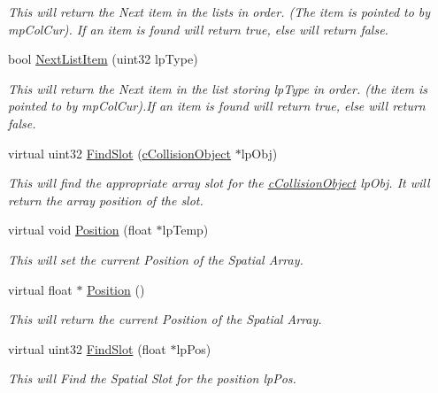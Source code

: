 \begin{DoxyCompactItemize}
\begin{DoxyCompactList}\small\item\em This will return the Next item in the lists in order. (The item is pointed to by mpColCur). If an item is found will return true, else will return false. \item\end{DoxyCompactList}\item 
bool \hyperlink{classc_collision_handler_type_adcf86464b4fd085e86f2c3365f7d3452}{NextListItem} (uint32 lpType)
\begin{DoxyCompactList}\small\item\em This will return the Next item in the list storing lpType in order. (the item is pointed to by mpColCur).If an item is found will return true, else will return false. \item\end{DoxyCompactList}\item 
virtual uint32 \hyperlink{classc_collision_handler_type_a6935d209eccb9c605fac6208c61b98b7}{FindSlot} (\hyperlink{classc_collision_object}{cCollisionObject} $\ast$lpObj)
\begin{DoxyCompactList}\small\item\em This will find the appropriate array slot for the \hyperlink{classc_collision_object}{cCollisionObject} lpObj. It will return the array position of the slot. \item\end{DoxyCompactList}\item 
virtual void \hyperlink{classc_collision_handler_type_a56be05fb67ba225b671c6b38e05cc762}{Position} (float $\ast$lpTemp)
\begin{DoxyCompactList}\small\item\em This will set the current Position of the Spatial Array. \item\end{DoxyCompactList}\item 
virtual float $\ast$ \hyperlink{classc_collision_handler_type_a708db7524f542b2e1164fc4e7e8ab3dd}{Position} ()
\begin{DoxyCompactList}\small\item\em This will return the current Position of the Spatial Array. \item\end{DoxyCompactList}\item 
virtual uint32 \hyperlink{classc_collision_handler_type_aef03e4dfc78ee53e0ebee35456412352}{FindSlot} (float $\ast$lpPos)
\begin{DoxyCompactList}\small\item\em This will Find the Spatial Slot for the position lpPos. \item\end{DoxyCompactList}\item 

\end{DoxyCompactItemize}

